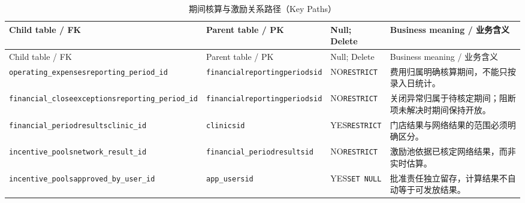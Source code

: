 \begingroup\footnotesize\setlength{\tabcolsep}{3pt}
\begin{longtable}{@{}L{43mm}L{32mm}L{24mm}L{49mm}@{}}
\caption{期间核算与激励关系路径（Key Paths）}\label{tab:domain-key-08}\\\toprule
Child table / FK & Parent table / PK & Null; Delete & Business meaning / 业务含义\\\midrule\endfirsthead
\toprule Child table / FK & Parent table / PK & Null; Delete & Business meaning / 业务含义\\\midrule\endhead
\texttt{operating\_expenses}\newline\texttt{reporting\_period\_id} & \texttt{financial}\newline\texttt{reporting}\newline\texttt{periods}\newline\texttt{id} & NO\newline\texttt{RESTRICT} & 费用归属明确核算期间，不能只按录入日统计。\\
\texttt{financial\_close}\newline\texttt{exceptions}\newline\texttt{reporting\_period\_id} & \texttt{financial}\newline\texttt{reporting}\newline\texttt{periods}\newline\texttt{id} & NO\newline\texttt{RESTRICT} & 关闭异常归属于待核定期间；阻断项未解决时期间保持开放。\\
\texttt{financial\_period}\newline\texttt{results}\newline\texttt{clinic\_id} & \texttt{clinics}\newline\texttt{id} & YES\newline\texttt{RESTRICT} & 门店结果与网络结果的范围必须明确区分。\\
\texttt{incentive\_pools}\newline\texttt{network\_result\_id} & \texttt{financial\_period}\newline\texttt{results}\newline\texttt{id} & NO\newline\texttt{RESTRICT} & 激励池依据已核定网络结果，而非实时估算。\\
\texttt{incentive\_pools}\newline\texttt{approved\_by\_user\_id} & \texttt{app\_users}\newline\texttt{id} & YES\newline\texttt{SET NULL} & 批准责任独立留存，计算结果不自动等于可发放结果。\\
\bottomrule\end{longtable}\endgroup


